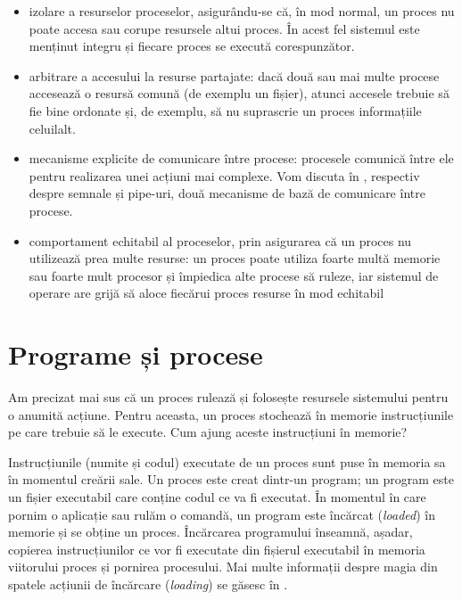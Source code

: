 \begin{itemize}
  \item izolare a resurselor proceselor, asigurându-se că, în mod normal, un proces nu poate accesa sau corupe resursele altui proces.
    În acest fel sistemul este menținut integru și fiecare proces se execută corespunzător.
  \item arbitrare a accesului la resurse partajate: dacă două sau mai multe procese accesează o resursă comună (de exemplu un fișier), atunci accesele trebuie să fie bine ordonate și, de exemplu, să nu suprascrie un proces informațiile celuilalt.
  \item mecanisme explicite de comunicare între procese: procesele comunică între ele pentru realizarea unei acțiuni mai complexe.
    Vom discuta în , respectiv  despre semnale și pipe-uri, două mecanisme de bază de comunicare între procese.
  \item comportament echitabil al proceselor, prin asigurarea că un proces nu utilizează prea multe resurse: un proces poate utiliza foarte multă memorie sau foarte mult procesor și împiedica alte procese să ruleze, iar sistemul de operare are grijă să aloce fiecărui proces resurse în mod echitabil
\end{itemize}

\section{Programe și procese}
\label{sec:process:process-program}

Am precizat mai sus că un proces rulează și folosește resursele sistemului pentru o anumită acțiune.
Pentru aceasta, un proces stochează în memorie instrucțiunile pe care trebuie să le execute.
Cum ajung aceste instrucțiuni în memorie?

Instrucțiunile (numite și codul) executate de un proces sunt puse în memoria sa în momentul creării sale.
Un proces este creat dintr-un program;
un program este un fișier executabil care conține codul ce va fi executat.
În momentul în care pornim o aplicație sau rulăm o comandă, un program este încărcat (\textit{loaded}) în memorie și se obține un proces.
Încărcarea programului înseamnă, așadar, copierea instrucțiunilor ce vor fi executate din fișierul executabil în memoria viitorului proces și pornirea procesului.
Mai multe informații despre magia din spatele acțiunii de încărcare (\textit{loading}) se găsesc în .

